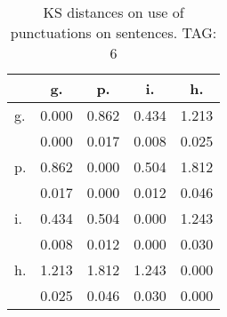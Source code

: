 \begin{table}[h!]
\begin{center}
\begin{tabular}{| l | c | c | c | c |}\hline
 & g. & p. & i. & h. \\\hline
g. & 0.000  & 0.862  & 0.434  & 1.213 \\\hline
 & 0.000  & 0.017  & 0.008  & 0.025 \\\hline
p. & 0.862  & 0.000  & 0.504  & 1.812 \\\hline
 & 0.017  & 0.000  & 0.012  & 0.046 \\\hline
i. & 0.434  & 0.504  & 0.000  & 1.243 \\\hline
 & 0.008  & 0.012  & 0.000  & 0.030 \\\hline
h. & 1.213  & 1.812  & 1.243  & 0.000 \\\hline
 & 0.025  & 0.046  & 0.030  & 0.000 \\\hline
\end{tabular}
\caption{KS distances on use of punctuations on sentences. TAG: 6}
\end{center}
\end{table}